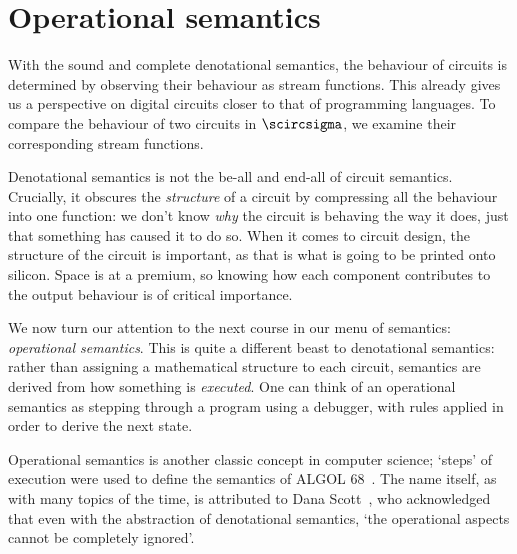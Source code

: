 \chapter{Operational semantics}\label{chap:operational}

With the sound and complete denotational semantics, the behaviour of circuits is
determined by observing their behaviour as stream functions.
This already gives us a perspective on digital circuits closer to that of
programming languages.
To compare the behaviour of two circuits in \(\scircsigma\), we examine their
corresponding stream functions.

Denotational semantics is not the be-all and end-all of circuit semantics.
Crucially, it obscures the \emph{structure} of a circuit by compressing all the
behaviour into one function: we don't know \emph{why} the circuit is behaving
the way it does, just that something has caused it to do so.
When it comes to circuit design, the structure of the circuit is important, as
that is what is going to be printed onto silicon.
Space is at a premium, so knowing how each component contributes to the
output behaviour is of critical importance.

We now turn our attention to the next course in our menu of semantics:
\emph{operational semantics}.
This is quite a different beast to denotational semantics: rather than assigning
a mathematical structure to each circuit, semantics are derived from how
something is \emph{executed}.
One can think of an operational semantics as stepping through a
program using a debugger, with rules applied in order to derive the next state.

Operational semantics is another classic concept in computer science; `steps' of
execution were used to define the semantics of ALGOL
68~\cite{vanwijngaarden1976revised}.
The name itself, as with many topics of the time, is attributed to Dana
Scott~\cite{scott1970outline}, who acknowledged that even with the abstraction
of denotational semantics, `the operational aspects cannot be completely
ignored'.

